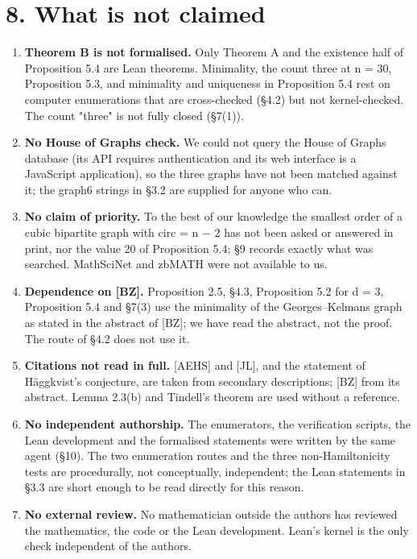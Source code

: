 \documentclass[11pt,a4paper]{article}
\theoremstyle{named}
\begin{document}
\section*{8. What is not claimed}
\begin{enumerate}
\item[1.] \textbf{Theorem B is not formalised.} Only Theorem A and the existence half of Proposition 5.4 are Lean theorems. Minimality, the count three at n = 30, Proposition 5.3, and minimality and uniqueness in Proposition 5.4 rest on computer enumerations that are cross-checked (§4.2) but not kernel-checked. The count "three" is not fully closed (§7(1)).
\item[2.] \textbf{No House of Graphs check.} We could not query the House of Graphs database (its API requires authentication and its web interface is a JavaScript application), so the three graphs have not been matched against it; the graph6 strings in §3.2 are supplied for anyone who can.
\item[3.] \textbf{No claim of priority.} To the best of our knowledge the smallest order of a cubic bipartite graph with circ = n − 2 has not been asked or answered in print, nor the value 20 of Proposition 5.4; §9 records exactly what was searched. MathSciNet and zbMATH were not available to us.
\item[4.] \textbf{Dependence on [BZ].} Proposition 2.5, §4.3, Proposition 5.2 for d = 3, Proposition 5.4 and §7(3) use the minimality of the Georges–Kelmans graph as stated in the abstract of [BZ]; we have read the abstract, not the proof. The route of §4.2 does not use it.
\item[5.] \textbf{Citations not read in full.} [AEHS] and [JL], and the statement of Häggkvist's conjecture, are taken from secondary descriptions; [BZ] from its abstract. Lemma 2.3(b) and Tindell's theorem are used without a reference.
\item[6.] \textbf{No independent authorship.} The enumerators, the verification scripts, the Lean development and the formalised statements were written by the same agent (§10). The two enumeration routes and the three non-Hamiltonicity tests are procedurally, not conceptually, independent; the Lean statements in §3.3 are short enough to be read directly for this reason.
\item[7.] \textbf{No external review.} No mathematician outside the authors has reviewed the mathematics, the code or the Lean development. Lean's kernel is the only check independent of the authors.
\end{enumerate}
\end{document}
